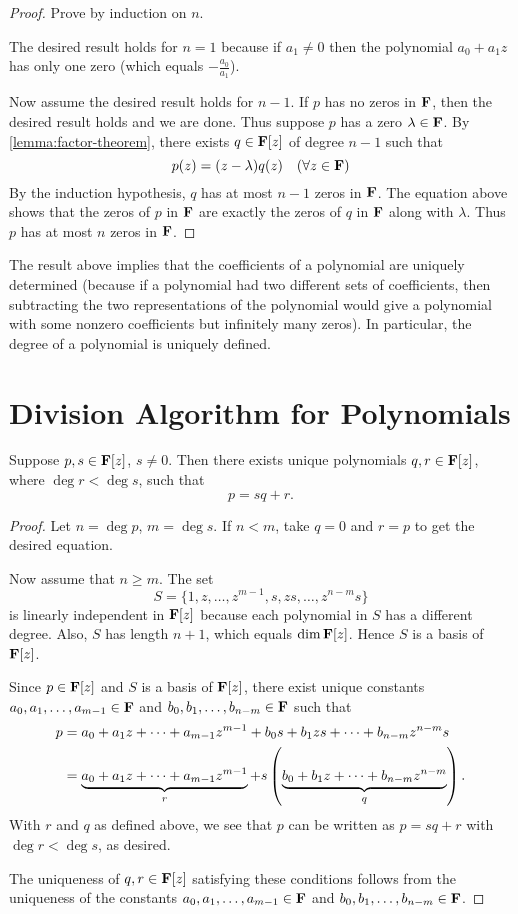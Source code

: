 \begin{proof}
Prove by induction on $n$.

The desired result holds for $n=1$ because if $a_1\neq0$ then the polynomial $a_0+a_1z$ has only one zero (which equals $-\frac{a_0}{a_1}$).

Now assume the desired result holds for $n-1$. If $p$ has no zeros in $\mathbf F$, then the desired result holds and we are done. Thus suppose $p$ has a zero $\lambda\in\mathbf F$. By \ref{lemma:factor-theorem}, there exists $q\in\mathbf F[z]$ of degree $n-1$ such that
\[p(z)=(z-\lambda)q(z)\quad(\forall z\in\mathbf F)\]
By the induction hypothesis, $q$ has at most $n-1$ zeros in $\mathbf F$. The equation above shows that the zeros of $p$ in $\mathbf F$ are exactly the zeros of $q$ in $\mathbf F$ along with $\lambda$. Thus $p$ has at most $n$ zeros in $\mathbf F$.
\end{proof}

The result above implies that the coefficients of a polynomial are uniquely determined (because if a polynomial had two different sets of coefficients, then subtracting the two representations of the polynomial would give a polynomial with some nonzero coefficients but infinitely many zeros). In particular, the degree of a polynomial is uniquely defined.
\pagebreak

\section{Division Algorithm for Polynomials}
\begin{proposition}
Suppose $p,s\in\mathbf F[z]$, $s\neq0$. Then there exists unique polynomials $q,r\in\mathbf F[z]$, where $\deg r<\deg s$, such that
\[p=sq+r.\]
\end{proposition}

\begin{proof}
Let $n=\deg p$, $m=\deg s$. If $n<m$, take $q=0$ and $r=p$ to get the desired equation.

Now assume that $n\ge m$. The set
\[S=\{1,z,\dots,z^{m-1},s,zs,\dots,z^{n-m}s\}\]
is linearly independent in $\mathbf F[z]$ because each polynomial in $S$ has a different degree. Also, $S$ has length $n+1$, which equals $\dim\mathbf F[z]$. Hence $S$ is a basis of $\mathbf F[z]$.

Since $p\in\mathbf F[z]$ and $S$ is a basis of $\mathbf F[z]$, there exist unique constants $a_0,a_1,\dots,a_{m-1}\in\mathbf F$ and $b_0,b_1,\dots,b_{n-m}\in\mathbf F$ such that
\begin{align*}
p&=a_0+a_1z+\cdots+a_{m-1}z^{m-1}+b_0s+b_1zs+\cdots+b_{n-m}z^{n-m}s\\
&=\underbrace{a_0+a_1z+\cdots+a_{m-1}z^{m-1}}_{r}+s\left(\underbrace{b_0+b_1z+\cdots+b_{n-m}z^{n-m}}_{q}\right).
\end{align*}
With $r$ and $q$ as defined above, we see that $p$ can be written as $p=sq+r$ with $\deg r<\deg s$, as desired.

The uniqueness of $q,r\in\mathbf F[z]$ satisfying these conditions follows from the uniqueness of the constants $a_0,a_1,\dots,a_{m-1}\in\mathbf F$ and $b_0,b_1,\dots,b_{n-m}\in\mathbf F$.
\end{proof}
\pagebreak


